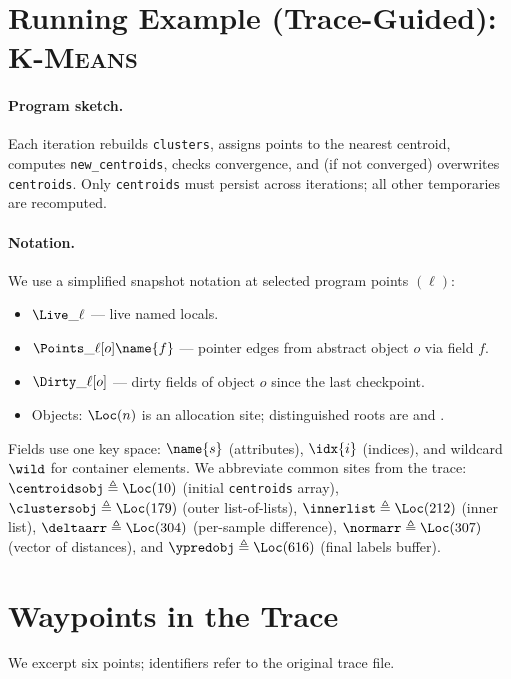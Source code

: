 
\clearpage
\section{Running Example (Trace-Guided): \textsc{K-Means}}

\paragraph{Program sketch.}
Each iteration rebuilds \texttt{clusters}, assigns points to the nearest centroid, computes \texttt{new\_centroids}, checks convergence, and (if not converged) overwrites \texttt{centroids}.
Only \texttt{centroids} must persist across iterations; all other temporaries are recomputed.

\paragraph{Notation.}
We use a simplified snapshot notation at selected program points $(\ell)$:
\begin{itemize}
\item $\Live\_\ell$ --- live named locals.
\item $\Points\_\ell[o]\name{f}$ --- pointer edges from abstract object $o$ via field $f$.
\item $\Dirty\_\ell[o]$ --- dirty fields of object $o$ since the last checkpoint.
\item Objects: $\Loc(n)$ is an allocation site; distinguished roots are \LOCALS{} and \GLOBALS{}.
\end{itemize}
Fields use one key space: $\name{s}$ (attributes), $\idx{i}$ (indices), and wildcard $\wild$ for container elements.
We abbreviate common sites from the trace: $\centroidsobj \triangleq \Loc(10)$ (initial \texttt{centroids} array), $\clustersobj \triangleq \Loc(179)$ (outer list-of-lists), $\innerlist \triangleq \Loc(212)$ (inner list), $\deltaarr \triangleq \Loc(304)$ (per-sample difference), $\normarr \triangleq \Loc(307)$ (vector of distances), and $\ypredobj \triangleq \Loc(616)$ (final labels buffer).

\section*{Waypoints in the Trace}
We excerpt six points; identifiers refer to the original trace file.

